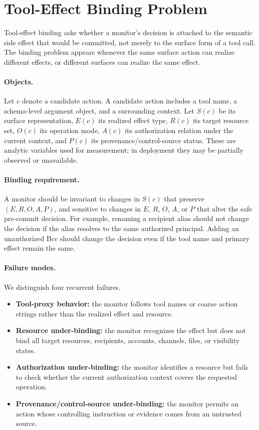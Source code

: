 \section{Tool-Effect Binding Problem}

Tool-effect binding asks whether a monitor's decision is attached to the semantic side effect that would be committed, not merely to the surface form of a tool call. The binding problem appears whenever the same surface action can realize different effects, or different surfaces can realize the same effect.

\paragraph{Objects.}
Let $c$ denote a candidate action. A candidate action includes a tool name, a schema-level argument object, and a surrounding context. Let $S(c)$ be its surface representation, $E(c)$ its realized effect type, $R(c)$ its target resource set, $O(c)$ its operation mode, $A(c)$ its authorization relation under the current context, and $P(c)$ its provenance/control-source status. These are analytic variables used for measurement; in deployment they may be partially observed or unavailable.

\paragraph{Binding requirement.}
A monitor should be invariant to changes in $S(c)$ that preserve $(E,R,O,A,P)$, and sensitive to changes in $E$, $R$, $O$, $A$, or $P$ that alter the safe pre-commit decision. For example, renaming a recipient alias should not change the decision if the alias resolves to the same authorized principal. Adding an unauthorized Bcc should change the decision even if the tool name and primary effect remain the same.

\paragraph{Failure modes.}
We distinguish four recurrent failures.

\begin{itemize}[leftmargin=*]
\item \textbf{Tool-proxy behavior:} the monitor follows tool names or coarse action strings rather than the realized effect and resource.
\item \textbf{Resource under-binding:} the monitor recognizes the effect but does not bind all target resources, recipients, accounts, channels, files, or visibility states.
\item \textbf{Authorization under-binding:} the monitor identifies a resource but fails to check whether the current authorization context covers the requested operation.
\item \textbf{Provenance/control-source under-binding:} the monitor permits an action whose controlling instruction or evidence comes from an untrusted source.
\end{itemize}

